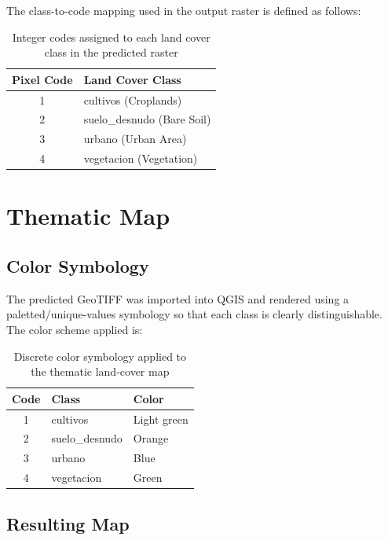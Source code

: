 \documentclass[12pt,a4paper]{article}
\begin{document}
The class-to-code mapping used in the output raster is defined as follows:

\begin{table}[H]
\centering
\begin{tabular}{|c|m{6cm}|}
\hline
\textbf{Pixel Code} & \textbf{Land Cover Class} \\
\hline
1 & cultivos (Croplands) \\
\hline
2 & suelo\_desnudo (Bare Soil) \\
\hline
3 & urbano (Urban Area) \\
\hline
4 & vegetacion (Vegetation) \\
\hline
\end{tabular}
\caption{Integer codes assigned to each land cover class in the predicted raster}
\end{table}

\section{Thematic Map}

\subsection{Color Symbology}

The predicted GeoTIFF was imported into QGIS and rendered using a paletted/unique-values symbology so that each class is clearly distinguishable. The color scheme applied is:

\begin{table}[H]
\centering
\begin{tabular}{|c|m{4cm}|m{4cm}|}
\hline
\textbf{Code} & \textbf{Class} & \textbf{Color} \\
\hline
1 & cultivos & Light green \\
\hline
2 & suelo\_desnudo & Orange \\
\hline
3 & urbano & Blue \\
\hline
4 & vegetacion & Green \\
\hline
\end{tabular}
\caption{Discrete color symbology applied to the thematic land-cover map}
\end{table}

\subsection{Resulting Map}
\end{document}

